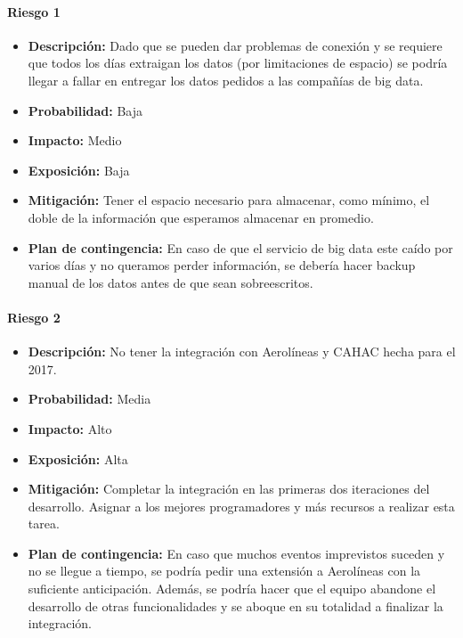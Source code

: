 \paragraph{Riesgo 1}
\begin{itemize}  
  \item \textbf{Descripción:} Dado que se pueden dar problemas de conexión y se requiere que todos los días extraigan los datos (por  limitaciones de espacio) se podría llegar a fallar en entregar los datos pedidos a las compañías de big data.
  \item \textbf{Probabilidad:} Baja
  \item \textbf{Impacto:} Medio
  \item \textbf{Exposición:} Baja
  \item \textbf{Mitigación:} Tener el espacio necesario para almacenar, como mínimo, el doble de la información que esperamos almacenar en promedio.
  \item \textbf{Plan de contingencia:} En caso de que el servicio de big data este caído por varios días y no queramos perder información, se debería hacer backup manual de los datos antes de que sean sobreescritos.
\end{itemize}

\paragraph{Riesgo 2}
\begin{itemize}
  \item \textbf{Descripción:} No tener la integración con Aerolíneas y CAHAC hecha para el 2017.
  \item \textbf{Probabilidad:} Media
  \item \textbf{Impacto:} Alto
  \item \textbf{Exposición:} Alta
  \item \textbf{Mitigación:} Completar la integración en las primeras dos iteraciones del desarrollo. Asignar a los mejores programadores y más recursos a realizar esta tarea.
  \item \textbf{Plan de contingencia:} En caso que muchos eventos imprevistos suceden y no se llegue a tiempo, se podría pedir una extensión a Aerolíneas con la suficiente anticipación. Además, se podría hacer que el equipo abandone el desarrollo de otras funcionalidades y se aboque en su totalidad a finalizar la integración.
\end{itemize}

